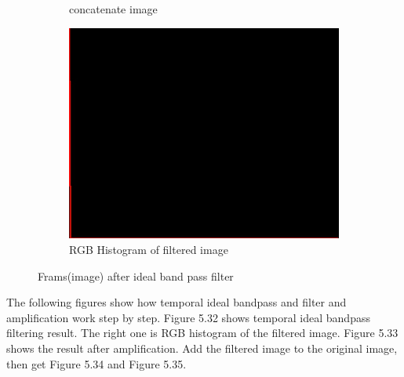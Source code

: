 \begin{figure}[!h]
\begin{subfigure}{.23\textwidth}
  \caption{concatenate image}
  \label{fig:sub2}
\end{subfigure}
\begin{subfigure}{.5\textwidth}
  \centering
  \includegraphics[scale=0.5]{img/eulerian/sample/filterRGB}
  \caption{RGB Histogram of filtered image}
  \label{fig:sub2}
\end{subfigure}
\caption{Frams(image) after ideal band pass filter}
\label{fig:test}
\end{figure}
The following figures show how temporal ideal bandpass and filter and amplification work step by step. Figure 5.32 shows temporal ideal bandpass filtering result. The right one is RGB histogram of the filtered image. Figure 5.33 shows the result after amplification. Add the filtered image to the original image, then get Figure 5.34 and Figure 5.35.\\

